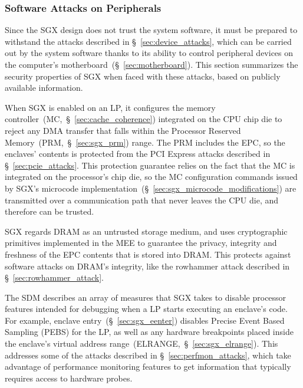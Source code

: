 \subsubsection{Software Attacks on Peripherals}
\label{sec:sgx_vs_device_attacks}

Since the SGX design does not trust the system software, it must be prepared to
withstand the attacks described in \S~\ref{sec:device_attacks}, which can be
carried out by the system software thanks to its ability to control peripheral
devices on the computer's motherboard~(\S~\ref{sec:motherboard}). This section
summarizes the security properties of SGX when faced with these attacks, based
on publicly available information.

When SGX is enabled on an LP, it configures the memory
controller~(MC,~\S~\ref{sec:cache_coherence}) integrated on the CPU chip die to
reject any DMA transfer that falls within the Processor Reserved
Memory~(PRM,~\S~\ref{sec:sgx_prm}) range. The PRM includes the EPC, so the
enclaves' contents is protected from the PCI Express attacks described in
\S~\ref{sec:pcie_attacks}. This protection guarantee relies on the fact that
the MC is integrated on the processor's chip die, so the MC configuration
commands issued by SGX's microcode
implementation~(\S~\ref{sec:sgx_microcode_modifications}) are transmitted over
a communication path that never leaves the CPU die, and therefore can be
trusted.

SGX regards DRAM as an untrusted storage medium, and uses cryptographic
primitives implemented in the MEE to guarantee the privacy, integrity and
freshness of the EPC contents that is stored into DRAM. This protects against
software attacks on DRAM's integrity, like the rowhammer attack described in
\S~\ref{sec:rowhammer_attack}.


The SDM describes an array of measures that SGX takes to disable processor
features intended for debugging when a LP starts executing an enclave's code.
For example, enclave entry~(\S~\ref{sec:sgx_eenter}) disables Precise Event
Based Sampling (PEBS) for the LP, as well as any hardware breakpoints placed
inside the enclave's virtual address range~(ELRANGE,~\S~\ref{sec:sgx_elrange}).
This addresses some of the attacks described in \S~\ref{sec:perfmon_attacks},
which take advantage of performance monitoring features to get information that
typically requires access to hardware probes.



